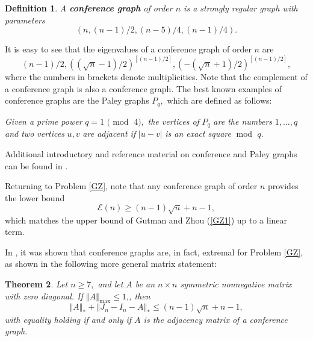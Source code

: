 \documentclass[12pt]{article}%
\newtheorem{theorem}{Theorem}[section]
\newtheorem{definition}[theorem]{Definition}
\begin{document}
\begin{definition}
A \textbf{conference graph} of order $n$ is a strongly regular graph with
parameters%
\[
\left(  n,\left(  n-1\right)  /2,\left(  n-5\right)  /4,\left(  n-1\right)
/4\right)  .
\]

\end{definition}

It is easy to see that the eigenvalues of a conference graph of order $n$ are
\[
\left(  n-1\right)  /2,\left(  (\sqrt{n}-1)/2\right)  ^{\left[  \left(
n-1\right)  /2\right]  },\left(  -\left(  \sqrt{n}+1\right)  /2\right)
^{\left[  \left(  n-1\right)  /2\right]  },
\]
where the numbers in brackets denote multiplicities. Note that the complement
of a conference graph is also a conference graph. The best known examples of
conference graphs are the Paley graphs $P_{q},$ which are defined as
follows:\medskip

\emph{Given a prime power }$q=1$\emph{ }$(\operatorname{mod}$\emph{ }%
$4),$\emph{ the vertices of }$P_{q}$\emph{ are the numbers }$1,\ldots,q$\emph{
and two vertices }$u,v$\emph{ are adjacent if }$\left\vert u-v\right\vert
$\emph{ is an exact square }$\operatorname{mod}$\emph{ }$q.$\medskip

Additional introductory and reference material on conference and Paley graphs
can be found in \cite{GoRo01}.\medskip

Returning to Problem \ref{GZ}, note that any conference graph of order $n$
provides the lower bound%
\begin{equation}
\mathcal{E}\left(  n\right)  \geq\left(  n-1\right)  \sqrt{n}+n-1,
\label{maxen1}%
\end{equation}
which matches the upper bound of Gutman and Zhou (\ref{GZ1}) up to a linear term.

In \cite{NiYu13}, it was shown that conference graphs are, in fact, extremal
for Problem \ref{GZ}, as shown in the following more general matrix statement:

\begin{theorem}
\label{NG1}Let $n\geq7,$ and let $A$ be an $n\times n$ symmetric nonnegative
matrix with zero diagonal. If $\left\Vert A\right\Vert _{\max}\leq1$,, then
\begin{equation}
\left\Vert A\right\Vert _{\ast}+\left\Vert J_{n}-I_{n}-A\right\Vert _{\ast
}\leq\left(  n-1\right)  \sqrt{n}+n-1, \label{main1}%
\end{equation}
with equality holding if and only if $A$ is the adjacency matrix of a
conference graph.
\end{theorem}
\end{document}
